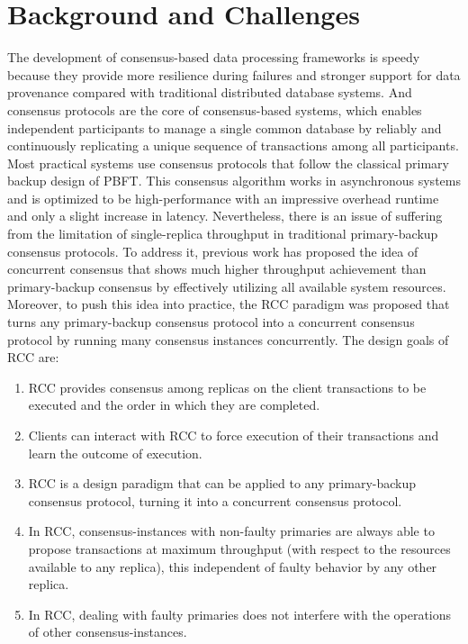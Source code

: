 \section{Background and Challenges}
The development of consensus-based data processing frameworks is speedy because they provide more 
resilience during failures and stronger support for data provenance compared with traditional 
distributed database systems. And consensus protocols are the core of consensus-based systems, 
which enables independent participants to manage a single common database by reliably and continuously 
replicating a unique sequence of transactions among all participants. Most practical systems use 
consensus protocols that follow the classical primary backup design of PBFT. This consensus 
algorithm works in asynchronous systems and is optimized to be high-performance with an impressive 
overhead runtime and only a slight increase in latency. Nevertheless, there is an issue of suffering 
from the limitation of single-replica throughput in traditional primary-backup consensus protocols. 
To address it, previous work has proposed the idea of concurrent consensus that shows much higher 
throughput achievement than primary-backup consensus by effectively utilizing all available system 
resources. Moreover, to push this idea into practice, the RCC paradigm was proposed that turns any 
primary-backup consensus protocol into a concurrent consensus protocol by running many consensus 
instances concurrently. The design goals of RCC are:
\begin{enumerate}
    \item  RCC provides consensus among replicas on the client transactions to be executed and the order in which they are completed.
    \item  Clients can interact with RCC to force execution of their transactions and learn the outcome of execution.
    \item  RCC is a design paradigm that can be applied to any primary-backup consensus protocol, turning it into a concurrent consensus protocol.
    \item  In RCC, consensus-instances with non-faulty primaries are always able to propose transactions at maximum throughput (with respect to the resources available to any replica), this independent of faulty behavior by any other replica.
    \item  In RCC, dealing with faulty primaries does not interfere with the operations of other consensus-instances.\\
\end{enumerate}

